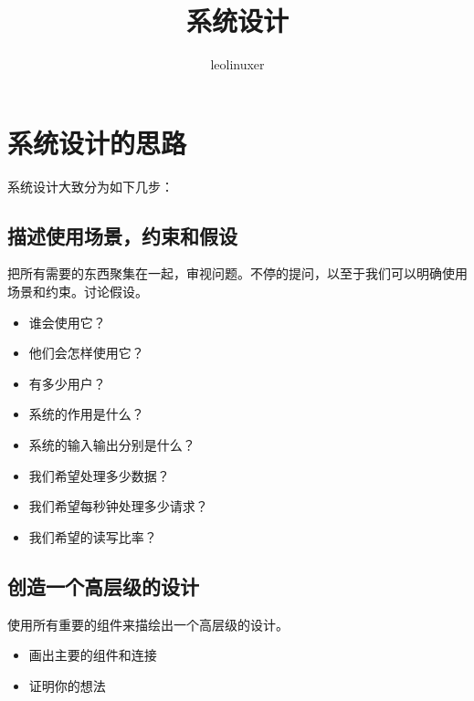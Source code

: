 \documentclass[12pt]{article}
\title{系统设计\cite{System_Design_Primer}}
\author{leolinuxer}
\begin{document}
\maketitle
\tableofcontents

\section{系统设计的思路}
系统设计大致分为如下几步：

\subsection{描述使用场景，约束和假设}
把所有需要的东西聚集在一起，审视问题。不停的提问，以至于我们可以明确使用场景和约束。讨论假设。
\begin{itemize}
\setlength{\itemsep}{0pt}
\setlength{\parsep}{0pt}
\setlength{\parskip}{0pt}
    \item 谁会使用它？
    \item 他们会怎样使用它？
    \item 有多少用户？
    \item 系统的作用是什么？
    \item 系统的输入输出分别是什么？
    \item 我们希望处理多少数据？
    \item 我们希望每秒钟处理多少请求？
    \item 我们希望的读写比率？
\end{itemize}

\subsection{创造一个高层级的设计}
使用所有重要的组件来描绘出一个高层级的设计。
\begin{itemize}
\setlength{\itemsep}{0pt}
\setlength{\parsep}{0pt}
\setlength{\parskip}{0pt}
    \item 画出主要的组件和连接
    \item 证明你的想法
\end{itemize}
\end{document}
